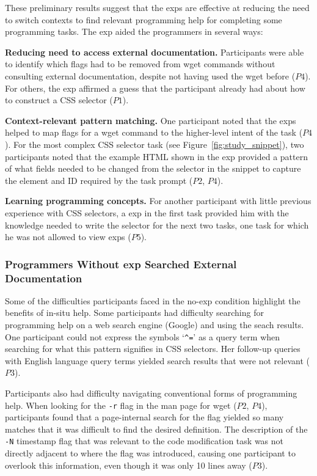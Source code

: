 

These preliminary results suggest that the \glspl{exp} are effective at reducing the need to switch contexts to find relevant programming help  for completing some programming tasks. 
The \gls{exp} aided the programmers in several ways:

{\bf Reducing need to access external documentation.}
Participants were  able to identify which flags had to be removed from wget commands without consulting external documentation, despite not having used the wget before ($P4$).
For others, the \gls{exp} affirmed a guess that the participant already had about how to construct a CSS selector ($P1$).

{\bf Context-relevant pattern matching.}
One participant noted that the \glspl{exp} helped  to map flags for a wget command to the higher-level intent of the task ($P4$). 
For the most complex CSS selector task (see Figure~\ref{fig:study_snippet}), two participants noted
that the example HTML shown in the \gls{exp} 
provided a pattern of what fields needed to be changed  from the selector in the snippet to capture the element and ID required by the task prompt ($P2$, $P4$).

{\bf Learning programming concepts.}
For another participant with little previous experience with CSS selectors, a \gls{exp} in  the first task provided him with the knowledge needed to write the selector for the next two tasks, one task for which he was not allowed to view \glspl{exp} ($P5$).

\subsubsection{Programmers Without \Gls{exp} Searched External Documentation}

Some of the difficulties participants faced in the no-\gls{exp} condition  highlight the benefits of in-situ help.
Some participants had difficulty searching for programming help on a web search engine (Google) and using the seach results.
One participant could not express the symbols `\texttt{\^{}=}' as a query term when searching for what  this pattern signifies in CSS selectors.
Her follow-up queries with English language query terms  yielded search results that were not relevant ($P3$).

Participants also had difficulty navigating conventional forms of programming help.
When looking for the \texttt{-r} flag in the man page for wget ($P2$, $P4$), participants found that a page-internal  search for the flag yielded so many matches that it was difficult to find the desired definition.
The description of the \texttt{-N} timestamp flag that was relevant to the code modification task was not directly adjacent to where the flag was introduced, causing one participant to overlook this information, even though it was only 10 lines away ($P3$).

